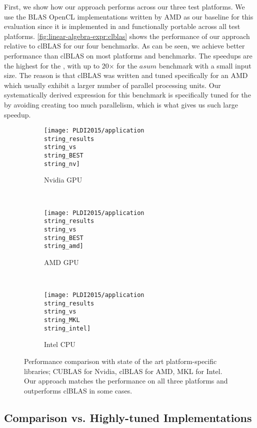First, we show how our approach performs across our three test platforms.
We use the BLAS OpenCL implementations written by AMD as our baseline for this evaluation since it is implemented in \OpenCL and functionally portable across all test platforms.
\autoref{fig:linear-algebra-expr:clblas} shows the performance of our approach relative to clBLAS for our four benchmarks.
As can be seen, we achieve better performance than clBLAS on most platforms and benchmarks.
The speedups are the highest for the \CPU, with up to 20$\times$ for the $asum$ benchmark with a small input size.
The reason is that clBLAS was written and tuned specifically for an AMD \GPU which usually exhibit a larger number of parallel processing units.
Our systematically derived expression for this benchmark is specifically tuned for the \CPU by avoiding creating too much parallelism, which is what gives us such large speedup.

\begin{figure*}[p]
  \centering
  \begin{subfigure}[b]{0.65\linewidth}
    \texttt{[image: PLDI2015/application\\string\_results\\string\_vs\\string\_BEST\\string\_nv]}
    \caption{Nvidia GPU}
    \label{fig:linear-algebra-expr:results:nv}
  \end{subfigure}
  \\
  \begin{subfigure}[b]{0.65\linewidth}
    \texttt{[image: PLDI2015/application\\string\_results\\string\_vs\\string\_BEST\\string\_amd]}
    \caption{AMD GPU}
    \label{fig:linear-algebra-expr:results:amd}
  \end{subfigure}
  \\
  \begin{subfigure}[b]{0.65\linewidth}
    \texttt{[image: PLDI2015/application\\string\_results\\string\_vs\\string\_MKL\\string\_intel]}
    \caption{Intel CPU}
    \label{fig:linear-algebra-expr:results:intel}
  \end{subfigure}
  \caption[Performance comparison with state of the art platform-specific libraries]%
          {Performance comparison with state of the art platform-specific libraries; CUBLAS for Nvidia, clBLAS for AMD, MKL for Intel.
           Our approach matches the performance on all three platforms and outperforms clBLAS in some cases.
         }
   \label{fig:linear-algebra-expr:results}
\end{figure*}




\subsection{Comparison vs. Highly-tuned Implementations}

